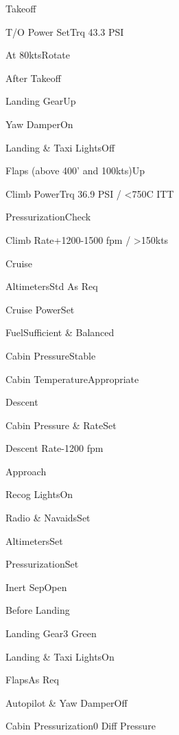 \documentclass[sim-use, halfpage]{checklist}
\begin{document}
\begin{checklist}{Takeoff}
  \item{T/O Power Set}{Trq 43.3 PSI}
  \item{At 80kts}{Rotate}
\end{checklist}

\begin{checklist}{After Takeoff}
  \item{Landing Gear}{Up}
  \item{Yaw Damper}{On}
  \item{Landing \& Taxi Lights}{Off}
  \item{Flaps (above 400' and 100kts)}{Up}
  \item{Climb Power}{Trq 36.9 PSI / <750C ITT}
  \item{Pressurization}{Check}
  \item{Climb Rate}{+1200-1500 fpm / >150kts}
\end{checklist}

\begin{checklist}{Cruise}
  \item{Altimeters}{Std As Req}
  \item{Cruise Power}{Set}
  \item{Fuel}{Sufficient \& Balanced}
  \item{Cabin Pressure}{Stable}
  \item{Cabin Temperature}{Appropriate}
\end{checklist}

\begin{checklist}{Descent}
  \item{Cabin Pressure \& Rate}{Set}
  \item{Descent Rate}{-1200 fpm}
\end{checklist}

\begin{checklist}{Approach}
  \item{Recog Lights}{On}
  \item{Radio \& Navaids}{Set}
  \item{Altimeters}{Set}
  \item{Pressurization}{Set}
  \item{Inert Sep}{Open}
\end{checklist}

\begin{checklist}{Before Landing}
  \item{Landing Gear}{3 Green}
  \item{Landing \& Taxi Lights}{On}
  \item{Flaps}{As Req}
  \item{Autopilot \& Yaw Damper}{Off}
  \item{Cabin Pressurization}{0 Diff Pressure}
\end{checklist}
\end{document}
